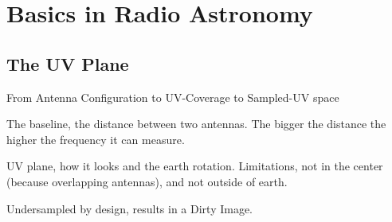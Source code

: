 \section{Basics in Radio Astronomy} \label{radio}



\subsection{The UV Plane}

From Antenna Configuration to UV-Coverage to Sampled-UV space

The baseline, the distance between two antennas. The bigger the distance the higher the frequency it can measure.

UV plane, how it looks and the earth rotation. Limitations, not in the center (because overlapping antennas), and not outside of earth.

Undersampled by design, results in a Dirty Image.